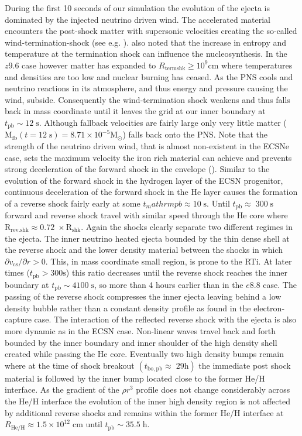 \documentclass[fleqn,usenatbib]{mnras}
\begin{document}
During the first 10 seconds of our simulation the evolution of the ejecta is dominated by the injected neutrino driven wind. The accelerated material encounters the post-shock matter with supersonic velocities creating the so-called wind-termination-shock (see e.g. \citet{Arcones2006}). \citet{Arcones2006} also noted that the increase in entropy and temperature at the termination shock can influence the nucleosynthesis. In the $z9.6$ case however matter has expanded to  $R_{\mathrm{term shk}} \geq 10^{9}\mathrm{cm}$ where temperatures and densities are too low and nuclear burning has ceased. 
As the PNS cools and neutrino reactions in its atmosphere, and thus energy and pressure causing the wind, subside. Consequently the wind-termination shock weakens and thus falls back in mass coordinate until it leaves the grid at our inner boundary at $t_{\mathrm{pb}}\sim 12\;\mathrm{s}$. Although fallback velocities are fairly large only very little matter ($\mathrm{M_{fb}}(t=12\;\mathrm{s})=8.71\times 10^{-5}\mathrm{M_{\odot}}$) falls back onto the PNS. Note that the strength of the neutrino driven wind, that is almost non-existent in the ECSNe case, sets the maximum velocity the iron rich material can achieve and prevents strong deceleration of the forward shock in the envelope (\citet{Wongwathanarat2015}). 
Similar to the evolution of the forward shock in the hydrogen layer of the ECSN progenitor, continuous deceleration of the forward shock in the He layer causes the formation of a reverse shock fairly early at some $t_mathrm{pb}\approx 10\;\mathrm{s}$. Until $t_{\mathrm{pb}}\approx \; 300\;\mathrm{s}$ forward and reverse shock travel with similar speed through the He core where $\mathrm{R_{rev.shk}\approx 0.72\;\times R_{shk}}$. 
Again the shocks clearly separate two different regimes in the ejecta. The inner neutrino heated ejecta bounded by the thin dense shell at the reverse shock and the lower density material between the shocks in which $\partial v_{\mathrm{cs}}/\partial r > 0$. This, in mass coordinate small region, is prone to the RTi. %
At later times ($t_{\mathrm{pb}} > 300  \mathrm{s}$) this ratio decreases until the reverse shock reaches the inner boundary at $t_{\mathrm{pb}}\sim 4100\;\mathrm{s}$, so more than 4 hours earlier than in the $e8.8$ case. The passing of the reverse shock compresses the inner ejecta leaving behind a low density bubble rather than a constant density profile as found in the electron-capture case.
The interaction of the reflected reverse shock with the ejecta is also more dynamic as in the ECSN case. Non-linear waves travel back and forth bounded by the inner boundary and inner shoulder of the high density shell created while passing the He core. Eventually two high density bumps remain where at the time of shock breakout $(t_{\mathrm{bo,pb}}\approx\; 29\mathrm{h})$ the immediate post shock material is followed by the inner bump located close to the former He/H interface. %
As the gradient of the $\rho r^3$ profile does not change considerably across the He/H interface the evolution of the inner high density region is not affected by additional reverse shocks and remains within the former He/H interface at $R_{\mathrm{He/H}}\approx 1.5\times 10^{12}\; \mathrm{cm}$ until $t_{\mathrm{pb}}\sim 35.5\;\mathrm{h}$.
\end{document}
